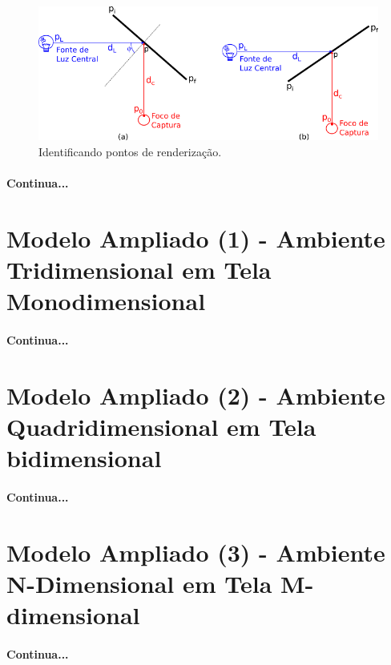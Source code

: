 \documentclass{article}
\begin{document}
	\paragraph{}
	\begin{figure}[h]
		\centering
		\includegraphics[scale=0.7]{radiosity-radial}
		\caption{Identificando pontos de renderização.}
		\label{fig:radio-rad}
	\end{figure}

	\paragraph{}
	\textbf{Continua...}
	
	\section{Modelo Ampliado (1) - Ambiente Tridimensional em Tela Monodimensional}
	
	\paragraph{}
	\textbf{Continua...}
	
	\section{Modelo Ampliado (2) - Ambiente Quadridimensional em Tela bidimensional}
	
	\paragraph{}
	\textbf{Continua...}
	
	\section{Modelo Ampliado (3) - Ambiente N-Dimensional em Tela M-dimensional}
	
	\paragraph{}
	\textbf{Continua...}
	
\end{document}
